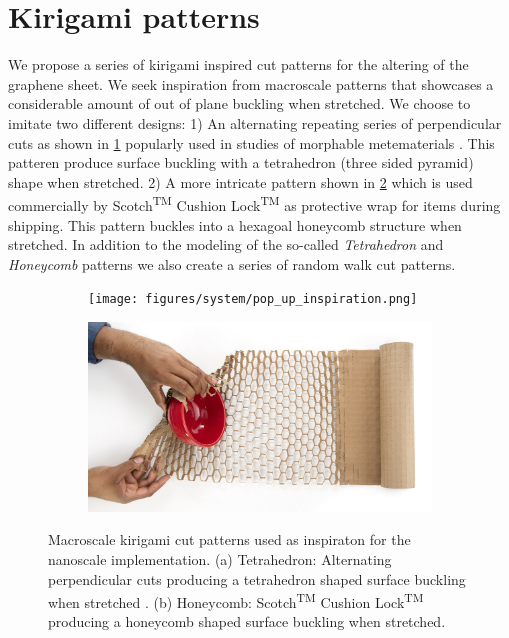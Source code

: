 \section{Kirigami patterns}
We propose a series of kirigami inspired cut patterns for the altering of the graphene sheet. We seek inspiration from macroscale patterns that showcases a considerable amount of out of plane buckling when stretched. We choose to imitate two different designs: 1) An alternating repeating series of perpendicular cuts as shown in \cref{fig:kirigami_inspiration_a} popularly used in studies of morphable metematerials \cite{new_pop_up}. This patteren produce surface buckling with a tetrahedron (three sided pyramid) shape when stretched. 2) A more intricate pattern shown in \cref{fig:kirigami_inspiration_b} which is used commercially by Scotch\textsuperscript{TM} Cushion Lock\textsuperscript{TM} \cite{cushion_wrap} as protective wrap for items during shipping. This pattern buckles into a hexagoal honeycomb structure when stretched. In addition to the modeling of the so-called \textit{Tetrahedron} and \textit{Honeycomb} patterns we also create a series of random walk cut patterns.

\begin{figure}[H]
  \centering
  \begin{subfigure}[t]{0.48\textwidth}
      \centering
      \texttt{[image: figures/system/pop\_up\_inspiration.png]}
      \caption{}
      \label{fig:kirigami_inspiration_a}
    \end{subfigure}
    \hfill
    \begin{subfigure}[t]{0.48\textwidth}
      \centering
      \includegraphics[width=\textwidth]{figures/system/honeycomb_inspiration.jpg}
      \caption{}
      \label{fig:kirigami_inspiration_b}
  \end{subfigure}
  \hfill
     \caption{Macroscale kirigami cut patterns used as inspiraton for the nanoscale implementation. (a) Tetrahedron: Alternating perpendicular cuts producing a tetrahedron shaped surface buckling when stretched \cite{new_pop_up}. (b) Honeycomb: Scotch\textsuperscript{TM} Cushion Lock\textsuperscript{TM} \cite{cushion_wrap} producing a honeycomb shaped surface buckling when stretched.}
     \label{fig:kirigami_inspiration}
\end{figure}

